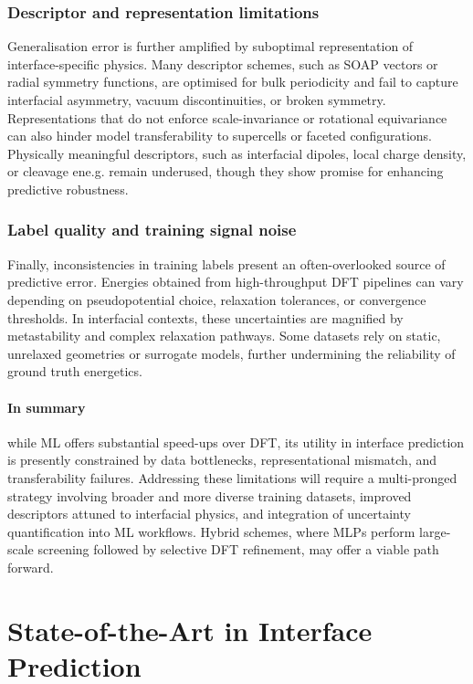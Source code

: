 \subsubsection{Descriptor and representation limitations}

Generalisation error is further amplified by suboptimal representation of interface-specific physics. Many descriptor schemes, such as SOAP vectors or radial symmetry functions, are optimised for bulk periodicity and fail to capture interfacial asymmetry, vacuum discontinuities, or broken symmetry. Representations that do not enforce scale-invariance or rotational equivariance can also hinder model transferability to supercells or faceted configurations. Physically meaningful descriptors, such as interfacial dipoles, local charge density, or cleavage ene.g. remain underused, though they show promise for enhancing predictive robustness.

\subsubsection{Label quality and training signal noise}

Finally, inconsistencies in training labels present an often-overlooked source of predictive error. Energies obtained from high-throughput DFT pipelines can vary depending on pseudopotential choice, relaxation tolerances, or convergence thresholds. In interfacial contexts, these uncertainties are magnified by metastability and complex relaxation pathways. Some datasets rely on static, unrelaxed geometries or surrogate models, further undermining the reliability of ground truth energetics.

\paragraph{In summary} while ML offers substantial speed-ups over DFT, its utility in interface prediction is presently constrained by data bottlenecks, representational mismatch, and transferability failures. Addressing these limitations will require a multi-pronged strategy involving broader and more diverse training datasets, improved descriptors attuned to interfacial physics, and integration of uncertainty quantification into ML workflows. Hybrid schemes, where MLPs perform large-scale screening followed by selective DFT refinement, may offer a viable path forward.

\section{State-of-the-Art in Interface Prediction} \label{section:state_of_the_art}

